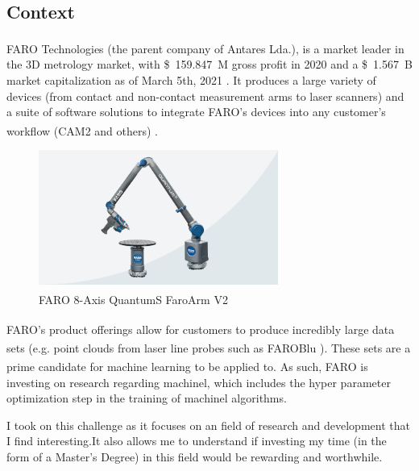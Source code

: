 
\subsection{Context}

FARO Technologies\textsuperscript{\textregistered} (the parent company of Antares Lda.), is a market leader in the 3D metrology market, with \SI{159.847}[\$]{M} gross profit in 2020 \parencite{faro_2021_financial_results} and a \SI{1.567}[\$]{B} market capitalization as of March 5th, 2021 \parencite{faro_stock_info}. It produces a large variety of devices (from contact and non-contact measurement arms to laser scanners) and a suite of software solutions to integrate FARO's devices into any customer's workflow (CAM2\textsuperscript{\textregistered} and others) \parencite{faro_homepage}.

\begin{figure}[h]
\centering
\includegraphics[width=0.7\textwidth]{images/faro_quantum_s_arm.png}
\caption{FARO\textsuperscript{\textregistered} 8-Axis QuantumS FaroArm\textsuperscript{\textregistered} V2}
\end{figure}
 
FARO\textsuperscript{\textregistered}'s product offerings allow for customers to produce incredibly large data sets (e.g. point clouds from laser line probes such as FAROBlu\textsuperscript{\textregistered} \parencite{faro_quantums}). These sets are a prime candidate for machine learning to be applied to. As such, FARO\textsuperscript{\textregistered} is investing on research regarding \acrlong{machinel}, which includes the hyper parameter optimization step in the training of \acrshort{machinel} algorithms.

I took on this challenge as it focuses on an field of research and development that I find interesting.It also allows me to understand if investing my time (in the form of a Master's Degree) in this field would be rewarding and worthwhile.